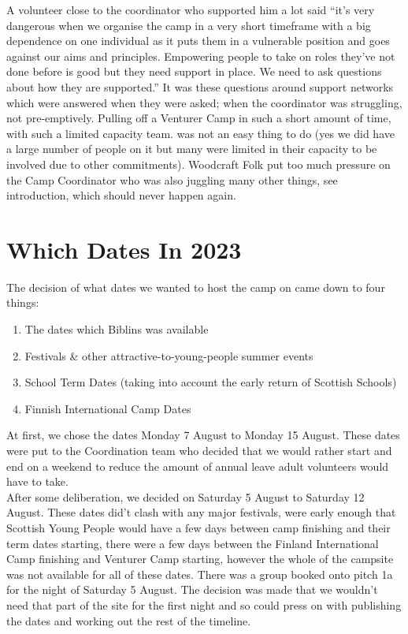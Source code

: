 A volunteer close to the coordinator who supported him a lot said ``it's very dangerous when we organise the camp in a very short timeframe with a big dependence on one individual as it puts them in a vulnerable position and goes against our aims and principles. Empowering people to take on roles they've not done before is good but they need support in place. We need to ask questions about how they are supported.'' It was these questions around support networks which were answered when they were asked; when the coordinator was struggling, not pre-emptively. Pulling off a Venturer Camp in such a short amount of time, with such a limited capacity team. was not an easy thing to do (yes we did have a large number of people on it but many were limited in their capacity to be involved due to other commitments). Woodcraft Folk put too much pressure on the Camp Coordinator who was also juggling many other things, see introduction, which should never happen again.

\section{Which Dates In 2023}
The decision of what dates we wanted to host the camp on came down to four things:
\begin{enumerate}
    \item The dates which Biblins was available
    \item Festivals \& other attractive-to-young-people summer events
    \item School Term Dates (taking into account the early return of Scottish Schools)
    \item Finnish International Camp Dates
\end{enumerate}

At first, we chose the dates Monday 7 August to Monday 15 August. These dates were put to the Coordination team who decided that we would rather start and end on a weekend to reduce the amount of annual leave adult volunteers would have to take.\\

After some deliberation, we decided on Saturday 5 August to Saturday 12 August. These dates did't clash with any major festivals, were early enough that Scottish Young People would have a few days between camp finishing and their term dates starting, there were a few days between the Finland International Camp finishing and Venturer Camp starting, however the whole of the campsite was not available for all of these dates. There was a group booked onto pitch 1a for the night of Saturday 5 August. The decision was made that we wouldn't need that part of the site for the first night and so could press on with publishing the dates and working out the rest of the timeline.

